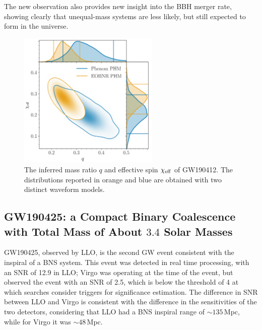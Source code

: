 \documentclass[binding=0.6cm, LaM]{sapthesis}
\begin{document}
	The new observation also provides new insight into the BBH merger rate, 
	showing clearly that unequal-mass systems are less likely, but still expected to form in the universe. \cite{133}

        \begin{figure}[!t]
          \label{asymmetric}
          \includegraphics[width=0.6\textwidth]{asymmetric}
          \centering
          \caption{The inferred mass ratio $q$ and effective spin $\chi_{\rm eff}$ of GW190412. The distributions reported in orange and blue are obtained with two distinct waveform models. \cite{133}} 
          \label{fig:asymmetric}
        \end{figure}

\subsection{GW190425: a Compact Binary Coalescence with Total Mass of About $3.4$ Solar Masses}
\label{subsec:GW190425}

	GW190425, observed by LLO, is the second GW event
	consistent with the inspiral of a BNS system.
	This event was detected in real time processing, with an SNR of 12.9 in LLO; 
	Virgo was operating at the time of the event, but observed the event with an SNR of 2.5, 
	which is below the threshold of 4 at which searches consider triggers for significance estimation. 
	The difference in SNR between LLO and Virgo is consistent with the difference 
	in the sensitivities of the two detectors, considering that LLO had 
	a BNS inspiral range of $\sim 135\,$Mpc, while for Virgo it was $\sim 48\,$Mpc.
\end{document}

